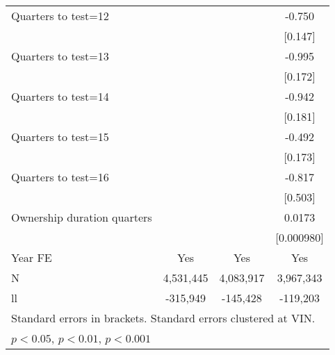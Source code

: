 \begin{longtable}{lccc}
Quarters to test=12 &                     &                     &      -0.750\sym{***}\tabularnewline
                    &                     &                     &     [0.147]         \tabularnewline
  
Quarters to test=13 &                     &                     &      -0.995\sym{***}\tabularnewline
                    &                     &                     &     [0.172]         \tabularnewline
  
Quarters to test=14 &                     &                     &      -0.942\sym{***}\tabularnewline
                    &                     &                     &     [0.181]         \tabularnewline
  
Quarters to test=15 &                     &                     &      -0.492\sym{**} \tabularnewline
                    &                     &                     &     [0.173]         \tabularnewline
  
Quarters to test=16 &                     &                     &      -0.817         \tabularnewline
                    &                     &                     &     [0.503]         \tabularnewline
  
Ownership duration quarters&                     &                     &      0.0173\sym{***}\tabularnewline
                    &                     &                     &  [0.000980]         \tabularnewline
  
Year FE             &         Yes         &         Yes         &         Yes         \tabularnewline
\hline
N                   &     4,531,445       &     4,083,917         &     3,967,343         \tabularnewline
ll                  &   -315,949          &   -145,428         &   -119,203         \tabularnewline
\hline\hline
\multicolumn{4}{l}{\footnotesize Standard errors in brackets. Standard errors clustered at VIN.}\tabularnewline
\multicolumn{4}{l}{\footnotesize \sym{*} \(p<0.05\), \sym{**} \(p<0.01\), \sym{***} \(p<0.001\)}\tabularnewline
\end{longtable}

\pagebreak

